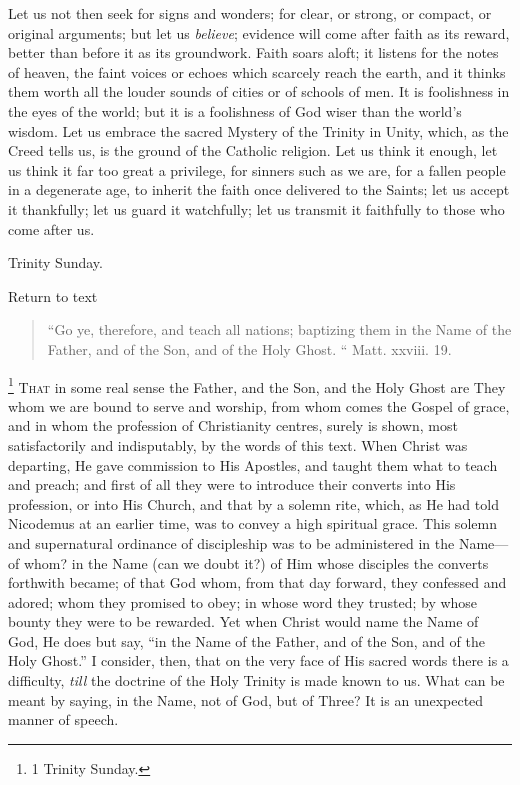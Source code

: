 Let us not then seek for signs and wonders; for clear, or strong,
or compact, or original arguments; but let us \emph{believe}; evidence
will come after faith as its reward, better than before it as its
groundwork. Faith soars aloft; it listens for the notes of heaven, the
faint voices or echoes which scarcely reach the earth, and it thinks
them worth all the louder sounds of cities or of schools of men. It is
foolishness in the eyes of the world; but it is a foolishness of God
wiser than the world's wisdom. Let us embrace the sacred Mystery of
the Trinity in Unity, which, as the Creed tells us, is the ground of
the Catholic religion. Let us think it enough, let us think it far too
great a privilege, for sinners such as we are, for a fallen people in
a degenerate age, to inherit the faith once delivered to the Saints;
let us accept it thankfully; let us guard it watchfully; let us
transmit it faithfully to those who come after us.


Trinity Sunday.

Return to text


\begin{quote}

``Go ye, therefore, and teach all nations; baptizing them in
the Name of the Father, and of the Son, and of the Holy Ghost.
`` Matt. xxviii. 19.

\end{quote}

\footnote{1 Trinity Sunday.} T\textsc{hat} in some real
sense the Father, and the Son, and the Holy Ghost are They whom we are
bound to serve and worship, from whom comes the Gospel of grace, and
in whom the profession of Christianity centres, surely is shown, most
satisfactorily and indisputably, by the words of this text. When
Christ was departing, He gave commission to His Apostles, and taught
them what to teach and preach; and first of all they were to introduce
their converts into His profession, or into His Church, and that by a
solemn rite, which, as He had told Nicodemus at an earlier time, was
to convey a high spiritual grace. This solemn and supernatural
ordinance of discipleship was to be administered in the Name—of
whom? in the Name (can we doubt it?) of Him whose disciples the
converts forthwith became; of that God whom, from that day forward,
they confessed and adored; whom they promised to obey; in whose word
they trusted; by whose bounty they were to be rewarded. Yet when
Christ would name the Name of God, He does but say, ``in the Name
of the Father, and of the Son, and of the Holy Ghost.'' I
consider, then, that on the very face of His sacred words there is a
difficulty, \emph{till} the doctrine of the Holy Trinity is made known
to us. What can be meant by saying, in the Name, not of God, but of
Three? It is an unexpected manner of speech.

